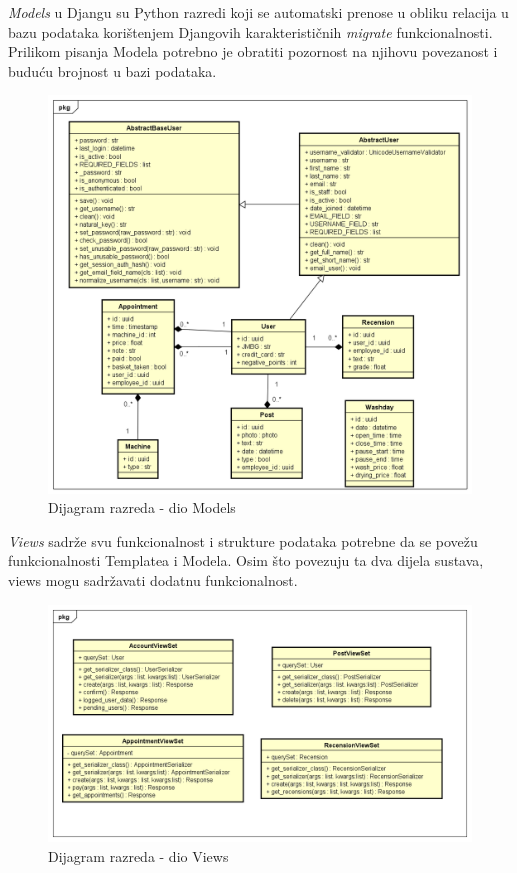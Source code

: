			\pagebreak
			\emph{Models} u Djangu su Python razredi koji se automatski prenose u obliku relacija u bazu podataka korištenjem Djangovih karakterističnih \emph {migrate} funkcionalnosti.  Prilikom pisanja Modela potrebno je obratiti pozornost na njihovu povezanost i buduću brojnost u bazi podataka. 	
			\begin{figure}[H]
				\includegraphics[scale=0.55]{slike/Razredni_dijagrami_Models.PNG} 
				\centering
				\caption{Dijagram razreda - dio Models}
				\label{fig:promjene}
			\end{figure}
		
			\pagebreak
			\emph{Views} sadrže svu funkcionalnost i strukture podataka potrebne da se povežu funkcionalnosti Templatea i Modela. Osim što povezuju ta dva dijela sustava, views mogu sadržavati dodatnu funkcionalnost.
			\begin{figure}[H]
				\includegraphics[scale=0.55]{slike/Razredni_dijagrami_Views.PNG}
				\centering
				\caption{Dijagram razreda - dio Views}
				\label{fig:promjene}
			\end{figure}  	
		
